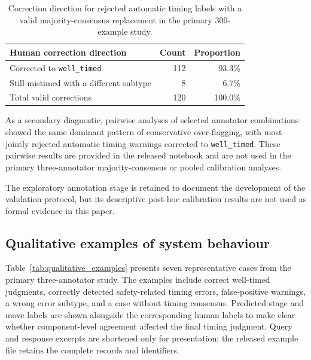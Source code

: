 \documentclass[preprint,12pt,a4paper]{elsarticle}
\begin{document}
\begin{table}[!htbp]
\centering
\caption{Correction direction for rejected automatic timing labels with a valid majority-consensus replacement in the primary 300-example study.}
\label{tab:correction_direction_300}
\small
{}
\begin{tabular}{lrr}
\toprule
\textbf{Human correction direction} & \textbf{Count} & \textbf{Proportion} \\
\midrule
Corrected to \texttt{well\_timed} & 112 & 93.3\% \\
Still mistimed with a different subtype & 8 & 6.7\% \\
\midrule
Total valid corrections & 120 & 100.0\% \\
\bottomrule
\end{tabular}
\end{table}

As a secondary diagnostic, pairwise analyses of selected annotator combinations showed the same dominant pattern of conservative over-flagging, with most jointly rejected automatic timing warnings corrected to \texttt{well\_timed}. These pairwise results are provided in the released notebook and are not used in the primary three-annotator majority-consensus or pooled calibration analyses.

The exploratory annotation stage is retained to document the development of the validation protocol, but its descriptive post-hoc calibration results are not used as formal evidence in this paper.

\subsection{Qualitative examples of system behaviour}
\label{subsec:qualitative_examples}

Table~\ref{tab:qualitative_examples} presents seven representative cases from the primary three-annotator study. The examples include correct well-timed judgments, correctly detected safety-related timing errors, false-positive warnings, a wrong error subtype, and a case without timing consensus. Predicted stage and move labels are shown alongside the corresponding human labels to make clear whether component-level agreement affected the final timing judgment. Query and response excerpts are shortened only for presentation; the released example file retains the complete records and identifiers.
\end{document}
